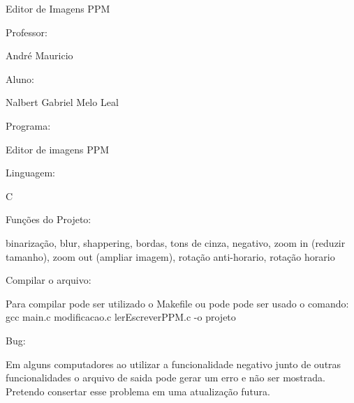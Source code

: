 Editor de Imagens P\+P\+M

Professor\+: \begin{DoxyVerb}André Mauricio
\end{DoxyVerb}


Aluno\+: \begin{DoxyVerb}Nalbert Gabriel Melo Leal
\end{DoxyVerb}


Programa\+: \begin{DoxyVerb}Editor de imagens PPM
\end{DoxyVerb}


Linguagem\+: \begin{DoxyVerb}C
\end{DoxyVerb}


Funções do Projeto\+: \begin{DoxyVerb}binarização,
blur,
shappering,
bordas,
tons de cinza,
negativo,
zoom in (reduzir tamanho),
zoom out (ampliar imagem),
rotação anti-horario,
rotação horario
\end{DoxyVerb}


Compilar o arquivo\+: \begin{DoxyVerb}Para compilar pode ser utilizado o Makefile ou pode pode ser usado o comando:  gcc main.c modificacao.c lerEscreverPPM.c -o projeto
\end{DoxyVerb}


Bug\+: \begin{DoxyVerb}Em alguns computadores ao utilizar a funcionalidade negativo junto de outras funcionalidades o arquivo de saida pode gerar um erro e não ser mostrada. Pretendo consertar esse problema em uma atualização futura. \end{DoxyVerb}
 